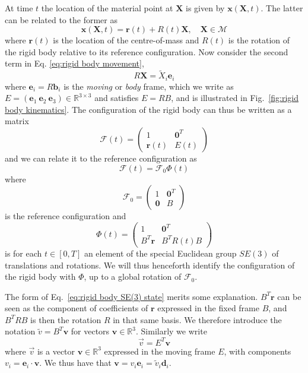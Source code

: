 At time $t$ the location of the material point at $\mathbf{X}$ is given by $\mathbf{x}(\mathbf{X}, t)$. The latter can be related to the former as
\begin{equation} \label{eq:rigid body movement}
\mathbf{x}(\mathbf{X}, t) = \mathbf{r}(t) + R(t) \mathbf{X}, \quad  \mathbf{X} \in \mathcal{M}
\end{equation}
where $\mathbf{r}(t)$ is the location of the centre-of-mass and $R(t)$ is the rotation of the rigid body relative to its reference configuration. Now consider the second term in Eq. \ref{eq:rigid body movement},
\begin{equation}
R \mathbf{X} = \tilde{X}_i \mathbf{e}_i
\end{equation}
where $\mathbf{e}_i = R \mathbf{b}_i$ is the \textit{moving} or \textit{body} frame, which we write as $E = (\mathbf{e}_1\ \mathbf{e}_2\ \mathbf{e}_3) \in \mathbb{R}^{3 \times 3}$ and satisfies $E = RB$, and is illustrated in Fig.~\ref{fig:rigid body kinematics}. The configuration of the rigid body can thus be written as a matrix
\begin{equation}
\mathcal{F}(t) = \begin{pmatrix}
1 & \mathbf{0}^T \\
\mathbf{r}(t) & E(t)
\end{pmatrix}
\end{equation}
and we can relate it to the reference configuration as
\begin{equation}
\mathcal{F}(t) = \mathcal{F}_0  \Phi(t)
\end{equation}
where
\begin{equation}
\mathcal{F}_0 = \begin{pmatrix}
1 & \mathbf{0}^T \\
\mathbf{0} & B
\end{pmatrix}
\end{equation}
is the reference configuration and
\begin{equation} \label{eq:rigid body SE(3) state}
\Phi(t) = \begin{pmatrix}
1 & \mathbf{0}^T \\
B^T \mathbf{r} & B^T R(t) B
\end{pmatrix}
\end{equation}
is for each $t \in [0, T]$ an element of the special Euclidean group $SE(3)$ of translations and rotations. We will thus henceforth identify the configuration of the rigid body with $\Phi$, up to a global rotation of $\mathcal{F}_0$. 

The form of Eq.~\ref{eq:rigid body SE(3) state} merits some explanation. $B^T \mathbf{r}$ can be seen as the component of coefficients of $\mathbf{r}$ expressed in the fixed frame $B$, and $B^T R B$ is then the rotation $R$ in that same basis. We therefore introduce the notation $\tilde{v} = B^T \mathbf{v}$ for vectors $\mathbf{v} \in \mathbb{R}^3$. Similarly we write
\begin{equation}
\vec{v} = E^T \mathbf{v}
\end{equation}
where $\vec{v}$ is a vector $\mathbf{v} \in \mathbb{R}^3$ expressed in the moving frame $E$, with components $v_i = \mathbf{e}_i \cdot \mathbf{v}$. We thus have that $\mathbf{v} = v_i \mathbf{e}_i = \tilde{v}_i \mathbf{d}_i$.

